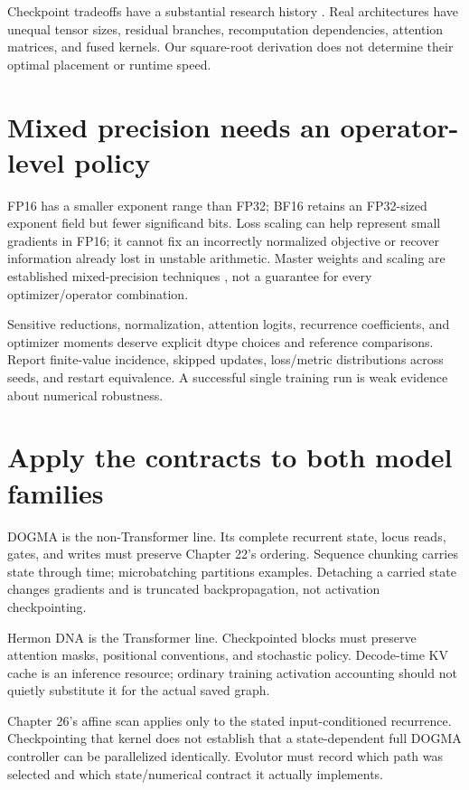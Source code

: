 Checkpoint tradeoffs have a substantial research history \cite{chen2016}.
Real architectures have unequal tensor sizes, residual branches, recomputation
dependencies, attention matrices, and fused kernels. Our square-root derivation
does not determine their optimal placement or runtime speed.

\section{Mixed precision needs an operator-level policy}
FP16 has a smaller exponent range than FP32; BF16 retains an FP32-sized exponent
field but fewer significand bits. Loss scaling can help represent small gradients
in FP16; it cannot fix an incorrectly normalized objective or recover information
already lost in unstable arithmetic. Master weights and scaling are established
mixed-precision techniques \cite{micikevicius2018}, not a guarantee for every
optimizer/operator combination.

Sensitive reductions, normalization, attention logits, recurrence coefficients,
and optimizer moments deserve explicit dtype choices and reference comparisons.
Report finite-value incidence, skipped updates, loss/metric distributions across
seeds, and restart equivalence. A successful single training run is weak evidence
about numerical robustness.

\section{Apply the contracts to both model families}
DOGMA is the non-Transformer line. Its complete recurrent state, locus reads,
gates, and writes must preserve Chapter 22's ordering. Sequence chunking carries
state through time; microbatching partitions examples. Detaching a carried state
changes gradients and is truncated backpropagation, not activation checkpointing.

Hermon DNA is the Transformer line. Checkpointed blocks must preserve attention
masks, positional conventions, and stochastic policy. Decode-time KV cache is an
inference resource; ordinary training activation accounting should not quietly
substitute it for the actual saved graph.

Chapter 26's affine scan applies only to the stated input-conditioned recurrence.
Checkpointing that kernel does not establish that a state-dependent full DOGMA
controller can be parallelized identically. Evolutor must record which path was
selected and which state/numerical contract it actually implements.

